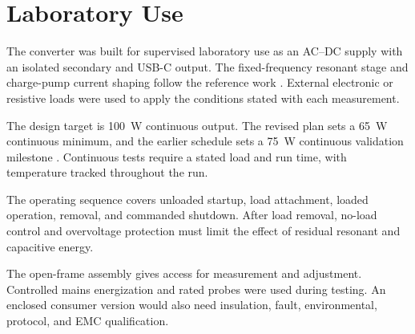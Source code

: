 \section{Laboratory Use}
\label{sec:req-usecase}

The converter was built for supervised laboratory use as an AC--DC supply with an isolated secondary and USB-C output. The fixed-frequency resonant stage and charge-pump current shaping follow the reference work \cite{ammar2020chargepump,ammar2021led}. External electronic or resistive loads were used to apply the conditions stated with each measurement.

The design target is \SI{100}{\watt} continuous output. The revised plan sets a \SI{65}{\watt} continuous minimum, and the earlier schedule sets a \SI{75}{\watt} continuous validation milestone \cite{projectOctoberPlan,projectEarlierPlan}. Continuous tests require a stated load and run time, with temperature tracked throughout the run.

The operating sequence covers unloaded startup, load attachment, loaded operation, removal, and commanded shutdown. After load removal, no-load control and overvoltage protection must limit the effect of residual resonant and capacitive energy.

The open-frame assembly gives access for measurement and adjustment. Controlled mains energization and rated probes were used during testing. An enclosed consumer version would also need insulation, fault, environmental, protocol, and EMC qualification.
